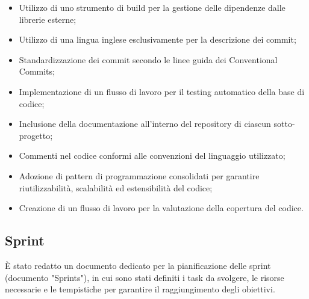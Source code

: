 \begin{itemize}
    \item Utilizzo di uno strumento di build per la gestione delle dipendenze dalle librerie esterne;
    \item Utilizzo di una lingua inglese esclusivamente per la descrizione dei commit;
    \item Standardizzazione dei commit secondo le linee guida dei Conventional Commits;
    \item Implementazione di un flusso di lavoro per il testing automatico della base di codice;
    \item Inclusione della documentazione all'interno del repository di ciascun sotto-progetto;
    \item Commenti nel codice conformi alle convenzioni del linguaggio utilizzato;
    \item Adozione di pattern di programmazione consolidati per garantire riutilizzabilità, scalabilità ed estensibilità del codice;
    \item Creazione di un flusso di lavoro per la valutazione della copertura del codice.
\end{itemize}

\subsection{Sprint}

È stato redatto un documento dedicato per la pianificazione delle sprint (documento "Sprints"), in cui sono stati definiti i task da svolgere, le risorse necessarie e le tempistiche per garantire il raggiungimento degli obiettivi.
